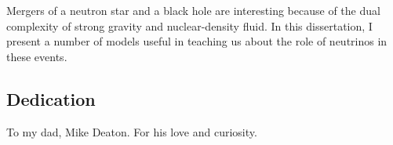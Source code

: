 \documentclass[12pt]{report}
\begin{document}
Mergers of a neutron star and a black hole are interesting because of the dual
complexity of strong gravity and nuclear-density fluid. In this dissertation,
I present a number of models useful in teaching us about the role of neutrinos
in these events.
\newpage

\tableofcontents
\newpage

\listoftables
{} %
\newpage

\listoffigures
{} %
\newpage

\begin{center}
  \subsection*{Dedication}
  To my dad, Mike Deaton. For his love and curiosity.
  \newpage
\end{center}




\newpage

%

%

%

%  


\end{document}
